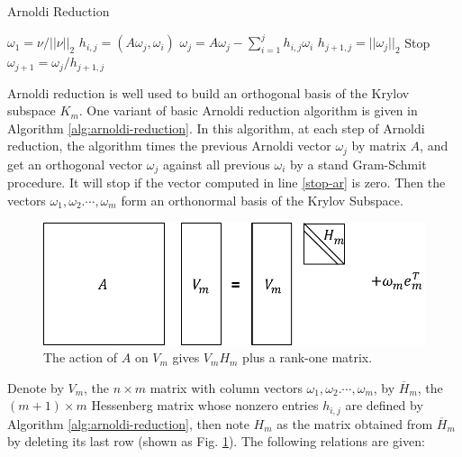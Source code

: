 \begin{algorithm}[htbp]{}
	\caption{Arnoldi Reduction}   
	\label{alg:arnoldi-reduction}   
	\begin{algorithmic}[1]
		\State $\omega_1=\nu /||\nu||_2$
		 \label{4-ar}
		\State $h_{i,j}=(A\omega_j,\omega_i)$ \label{5-ar}
		\EndFor \label{6-ar}
		\State $\omega_j=A\omega_j-\sum_{i=1}^jh_{i,j}\omega_i$ \label{7-ar}
		\State $h_{j+1,j}=||\omega_j||_2$ \label{8-ar}
		 Stop \label{stop-ar}
		\EndIf
		\State $\omega_{j+1}=\omega_j/h_{j+1,j}$
		\EndFor 
		\EndFunction
	\end{algorithmic}  
\end{algorithm}

Arnoldi reduction is well used to build an orthogonal basis of the Krylov subspace $K_m$. One variant of basic Arnoldi reduction algorithm is given in Algorithm \ref{alg:arnoldi-reduction}. In this algorithm, at each step of Arnoldi reduction, the algorithm times the previous Arnoldi vector $\omega_j$ by matrix $A$, and get an orthogonal vector $\omega_j$ against all previous $\omega_i$ by a stand Gram-Schmit procedure. It will stop if the vector computed in line \ref{stop-ar} is zero. Then the vectors $\omega_1, \omega_2. \cdots, \omega_m$ form an orthonormal basis of the Krylov Subspace. 

\begin{figure}[t]
	\centering
	\includegraphics[width=0.99\linewidth]{fig/arnoldi_reduction.pdf}
	\caption{ The action of $A$ on $V_m$ gives $V_mH_m$ plus a rank-one matrix.}
	\label{arnoldi}
\end{figure}

Denote by $V_m$, the $n \times m$ matrix with column vectors $\omega_1, \omega_2. \cdots, \omega_m$, by $\overline{H}_m$, the $(m+1) \times m$ Hessenberg matrix whose nonzero entries $h_{i,j}$ are defined by  Algorithm \ref{alg:arnoldi-reduction}, then note $H_m$ as the matrix obtained from  $\overline{H}_m$ by deleting its last row (shown as Fig. \ref{arnoldi}). The following relations are given:

